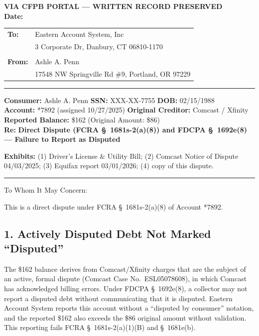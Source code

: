 \documentclass[12pt,letterpaper]{article}
\begin{document}
\begin{center}\textbf{VIA CFPB PORTAL --- WRITTEN RECORD PRESERVED}\\ \textbf{Date:} \underline{\hspace{3cm}}\end{center}

\begin{tabular}{@{}ll}
  \textbf{To:} & Eastern Account System, Inc \\ & 3 Corporate Dr, Danbury, CT 06810-1170 \\ & \\
  \textbf{From:} & Ashle A. Penn \\ & 17548 NW Springville Rd \#9, Portland, OR 97229 \\
\end{tabular}

\vspace{1em}\hrule\vspace{1em}
\textbf{Consumer:} Ashle A. Penn \quad \textbf{SSN:} XXX-XX-7755 \quad \textbf{DOB:} 02/15/1988 \\
\textbf{Account:} *7892 (assigned 10/27/2025) \quad \textbf{Original Creditor:} Comcast / Xfinity \\
\textbf{Reported Balance:} \$162 (Original Amount: \$86) \\
\textbf{Re:} \textbf{Direct Dispute (FCRA \S~1681s-2(a)(8)) and FDCPA \S~1692e(8) --- Failure to Report as Disputed}

\vspace{1em}\textbf{Exhibits:} (1) Driver's License \& Utility Bill; (2) Comcast Notice of Dispute 04/03/2025; (3) Equifax report 03/01/2026; (4) copy of this dispute.
\vspace{1em}\hrule\vspace{1em}

To Whom It May Concern:

This is a direct dispute under FCRA \S~1681s-2(a)(8) of Account *7892.

\subsection*{1. Actively Disputed Debt Not Marked ``Disputed''}
The \$162 balance derives from Comcast/Xfinity charges that are the subject of an active, formal dispute (Comcast Case No.\ ESL05078608), in which Comcast has acknowledged billing errors. Under FDCPA \S~1692e(8), a collector may not report a disputed debt without communicating that it is disputed. Eastern Account System reports this account without a ``disputed by consumer'' notation, and the reported \$162 also exceeds the \$86 original amount without validation. This reporting fails FCRA \S~1681s-2(a)(1)(B) and \S~1681e(b).
\end{document}

